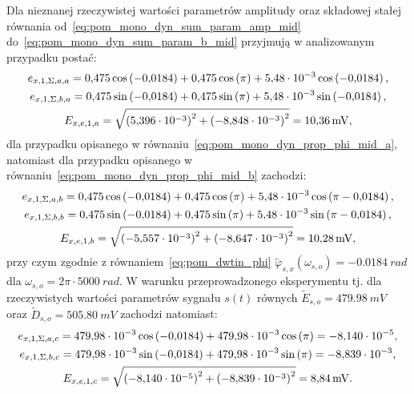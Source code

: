 Dla nieznanej rzeczywistej wartości parametrów amplitudy oraz składowej stałej równania od~\eqref{eq:pom_mono_dyn_sum_param_amp_mid} do~\eqref{eq:pom_mono_dyn_sum_param_b_mid} przyjmują w analizowanym przypadku postać:
\begin{gather}
e_{x,1,\Sigma,a,a} = \num{0.475} \cos \left(\num{-0.0184}\right) + \num{0.475} \cos \left(\pi\right) + \num{5.48e-3} \cos \left(\num{-0.0184}\right) \label{eq:pom_mono_dyn_sum_param_a_mid_val_a}, \\
e_{x,1,\Sigma,b,a} = \num{0.475} \sin \left(\num{-0.0184}\right) + \num{0.475} \sin \left(\pi\right) + \num{5.48e-3} \sin \left(\num{-0.0184}\right) \label{eq:pom_mono_dyn_sum_param_b_mid_val_a}, \\
E_{x,e,1,a} = \sqrt{\left(\num{5.396e-3}\right)^{2} + \left(\num{-8.848e-3}\right)^{2}} = \qty{10.36}{mV} \label{eq:pom_mono_dyn_sum_param_amp_mid_val_a},
\end{gather}
dla przypadku opisanego w równaniu~\eqref{eq:pom_mono_dyn_prop_phi_mid_a}, natomiast dla przypadku opisanego w równaniu~\eqref{eq:pom_mono_dyn_prop_phi_mid_b} zachodzi:
\begin{gather}
e_{x,1,\Sigma,a,b} = \num{0.475} \cos \left(\num{-0.0184}\right) + \num{0.475} \cos \left(\pi\right) + \num{5.48e-3} \cos \left(\pi - \num{0.0184}\right) \label{eq:pom_mono_dyn_sum_param_a_mid_val_b}, \\
e_{x,1,\Sigma,b,b} = \num{0.475} \sin \left(\num{-0.0184}\right) + \num{0.475} \sin \left(\pi\right) + \num{5.48e-3} \sin \left(\pi - \num{0.0184}\right) \label{eq:pom_mono_dyn_sum_param_b_mid_val_b}, \\
E_{x,e,1,b} = \sqrt{\left(\num{-5.557e-3}\right)^{2} + \left(\num{-8.647e-3}\right)^{2}} = \qty{10.28}{mV} \label{eq:pom_mono_dyn_sum_param_amp_mid_val_b},
\end{gather}
przy czym zgodnie z równaniem~\eqref{eq:pom_dwtin_phi} $\tilde{\varphi}_{s,x}(\omega_{s,o}) = \qty{-0.0184}{rad}$ dla $\omega_{s,o} = 2\pi \cdot \qty{5000}{rad}$. W warunku przeprowadzonego eksperymentu tj. dla rzeczywistych wartości parametrów sygnału $s(t)$ równych $\tilde{E}_{s,o} = \qty{479.98}{mV}$ oraz $\tilde{D}_{s,o} = \qty{505.80}{mV}$ zachodzi natomiast:
\begin{gather}
e_{x,1,\Sigma,a,c} = \qty{479.98e-3} \cos \left(\num{-0.0184}\right) + \qty{479.98e-3} \cos \left(\pi\right) = \num{-8.140e-5} \label{eq:pom_mono_dyn_sum_param_a_mid_val_c}, \\
e_{x,1,\Sigma,b,c} = \qty{479.98e-3} \sin \left(\num{-0.0184}\right) + \qty{479.98e-3} \sin \left(\pi\right) = \num{-8.839e-3} \label{eq:pom_mono_dyn_sum_param_b_mid_val_c}, \\
E_{x,e,1,c} = \sqrt{\left(\num{-8.140e-5}\right)^{2} + \left(\num{-8.839e-3}\right)^{2}} = \qty{8.84}{mV} \label{eq:pom_mono_dyn_sum_param_amp_mid_val_c}.
\end{gather}
